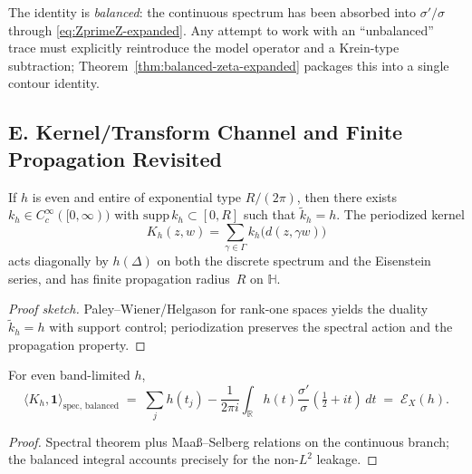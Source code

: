 \begin{remark}
The identity is \emph{balanced}: the continuous spectrum has been absorbed into $\sigma'/\sigma$ through \eqref{eq:ZprimeZ-expanded}. Any attempt to work with an ``unbalanced'' trace must explicitly reintroduce the model operator and a Krein-type subtraction; Theorem~\ref{thm:balanced-zeta-expanded} packages this into a single contour identity.
\end{remark}


\subsection*{E. Kernel/Transform Channel and Finite Propagation Revisited}
\label{subsec:kernel-channel-expanded}

\begin{theorem}
\label{thm:band-kernel-expanded}
If $h$ is even and entire of exponential type $R/(2\pi)$, then there exists $k_h\in C_c^\infty([0,\infty))$ with $\mathrm{supp}\,k_h\subset[0,R]$ such that $\widetilde k_h=h$. The periodized kernel
\[
  K_h(z,w)=\sum_{\gamma\in\Gamma} k_h\!\big(d(z,\gamma w)\big)
\]
acts diagonally by $h(\Delta)$ on both the discrete spectrum and the Eisenstein series, and has finite propagation radius~$R$ on $\mathbb H$.
\end{theorem}

\begin{proof}[Proof sketch]
Paley–Wiener/Helgason for rank-one spaces yields the duality $\widetilde k_h=h$ with support control; periodization preserves the spectral action and the propagation property.
\end{proof}

\begin{proposition}
\label{prop:kernel-equals-functional}
For even band-limited $h$,
\[
 \langle K_h,\mathbf 1\rangle_{\mathrm{spec,\,balanced}}
 \;=\; \sum_j h(t_j) - \frac{1}{2\pi i}
 \int_{\mathbb R} h(t)\frac{\sigma'}{\sigma}(\tfrac12+it)\,dt \;=\; \mathcal E_X(h).
\]
\end{proposition}

\begin{proof}
Spectral theorem plus Maaß–Selberg relations on the continuous branch; the balanced integral accounts precisely for the non-$L^2$ leakage.
\end{proof}

